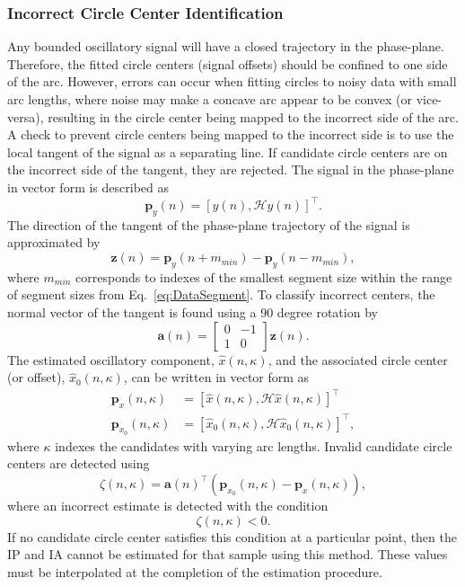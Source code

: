 \documentclass[journal,11pt,a4paper,onecolumn,draftcls]{IEEEtran}
\begin{document}
\subsubsection{Incorrect Circle Center Identification}
Any bounded oscillatory signal will have a closed trajectory in the phase-plane. Therefore, the fitted circle centers (signal offsets) should be confined to one side of the arc. However, errors can occur when fitting circles to noisy data with small arc lengths, where noise may make a concave arc appear to be convex (or vice-versa), resulting in the circle center being mapped to the incorrect side of the arc. A check to prevent circle centers being mapped to the incorrect side is to use the local tangent of the signal as a separating line. If candidate circle centers are on the incorrect side of the tangent, they are rejected. The signal in the phase-plane in vector form is described as
\begin{equation}
	\mathbf{p}_y(n) = \left[y\left(n\right),\mathcal{H}y\left(n\right)\right]^{\top}.
\end{equation}
The direction of the tangent of the phase-plane trajectory of the signal is approximated by 
\begin{equation}
	\mathbf{z}(n) = \mathbf{p}_y(n + m_{min}) - \mathbf{p}_y(n - m_{min}),
\end{equation}
where $m_{min}$ corresponds to indexes of the smallest segment size within the range of segment sizes from Eq.~\ref{eq:DataSegment}. To classify incorrect centers, the normal vector of the tangent is found using a 90 degree rotation by
\begin{equation}
	\mathbf{a}\left(n\right) = \left[\begin{array}{cc}
	0 & -1 \\
	1 & 0\end{array}\right]\mathbf{z}(n).
\end{equation}
The estimated oscillatory component, $\hat{x}(n,\kappa)$, and the associated circle center (or offset), $\hat{x}_0(n,\kappa)$, can be written in vector form as
\begin{align}
	\mathbf{p}_x(n,\kappa) &= \left[\hat{x}\left(n,\kappa\right),\mathcal{H}\hat{x}\left(n,\kappa\right)\right]^{\top} \\ 
	\mathbf{p}_{x_0}\left(n,\kappa\right) &= \left[\hat{x}_0\left(n,\kappa\right), \mathcal{H}\hat{x}_0\left(n,\kappa\right)\right]^{\top}, 
\end{align}
where $\kappa$ indexes the candidates with varying arc lengths. Invalid candidate circle centers are detected using 
\begin{equation}
    \zeta(n,\kappa) = \mathbf{a}\left( n\right)^{\top}\left( \mathbf{p}_{x_0}\left( n,\kappa \right) - \mathbf{p}_x\left( n,\kappa \right) \right),
\end{equation}
where an incorrect estimate is detected with the condition
\begin{equation}\label{eq:IncorrectSideClassifier}
    \zeta(n,\kappa) < 0.
\end{equation} 
If no candidate circle center satisfies this condition at a particular point, then the IP and IA cannot be estimated for that sample using this method. These values must be interpolated at the completion of the estimation procedure. 
\end{document}
